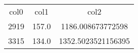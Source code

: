 \begin{table}
\begin{tabular}{ccc}
col0 & col1 & col2 \\
2919 & 157.0 & 1186.008673772598 \\
3315 & 134.0 & 1352.5023521156395 \\
\end{tabular}
\end{table}

